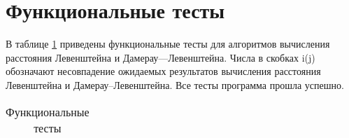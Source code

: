 \documentclass[a4paper,14pt, unknownkeysallowed]{extreport}
\begin{document}
\clearpage

\section{Функциональные тесты}

В таблице \ref{tbl:functional_test} приведены функциональные тесты для алгоритмов вычисления расстояния Левенштейна и Дамерау—Левенштейна. Числа в скобках i(j) обозначают несовпадение ожидаемых результатов вычисления расстояния Левенштейна и Дамерау--Левенштейна. Все тесты программа прошла успешно.


\begin{table}[h]
	\begin{center}
	\begin{threeparttable}
		\captionsetup{justification=raggedright,singlelinecheck=off}
		\caption{\label{tbl:functional_test} Функциональные тесты}
\begin{tabular}{|l|l|lllll|}



\end{tabular}
\end{threeparttable}
\end{center}
\end{table}
\end{document}
